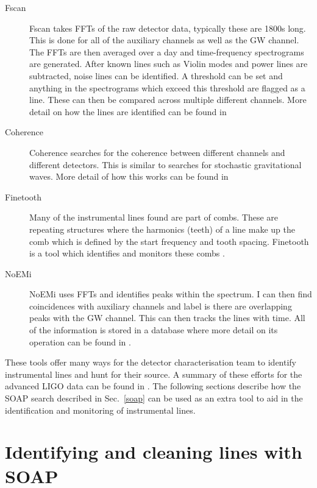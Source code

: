 \begin{description}
	\item[Fscan] Fscan \citep{coughlin2010NoiseLine} takes \acp{FFT} of the raw detector data, typically these are 1800s long. This is done for all of the auxiliary channels as well as the \ac{GW} channel. The \acp{FFT} are then averaged over a day and time-frequency spectrograms are generated. After known lines such as Violin modes and power lines are subtracted, noise lines can be identified. A threshold can be set and anything in the spectrograms which exceed this threshold are flagged as a line. These can then be compared across multiple different channels. More detail on how the lines are identified can be found in \citep{coughlin2010NoiseLine}
	
	\item[Coherence] Coherence searches for the coherence between different channels and different detectors. This is similar to searches for stochastic gravitational waves. More detail of how this works can be found in \citep{covas2018IdentificationMitigation}
	
	\item[Finetooth] Many of the instrumental lines found are part of combs. These are repeating structures where the harmonics (teeth) of a line make up the comb which is defined by the start frequency and tooth spacing. Finetooth is a tool which identifies and monitors these combs \citep{}.
	
	\item[NoEMi] NoEMi uses \acp{FFT} and identifies peaks within the spectrum. I can then find coincidences with auxiliary channels and label is there are overlapping peaks with the \ac{GW} channel. This can then tracks the lines with time. All of the information is stored in a database where more detail on its operation can be found in \citep{accadia2012NoEMiNoise}.
	
\end{description}


These tools offer many ways for the detector characterisation team to identify instrumental lines and hunt for their source. A summary of these efforts for the advanced \ac{LIGO} data can be found in \citep{covas2018IdentificationMitigation}.
The following sections describe how the SOAP search described in Sec.~\ref{soap} can be used as an extra tool to aid in the identification and monitoring of instrumental lines.

\section{\label{detchar:soap}Identifying and cleaning lines with SOAP}

